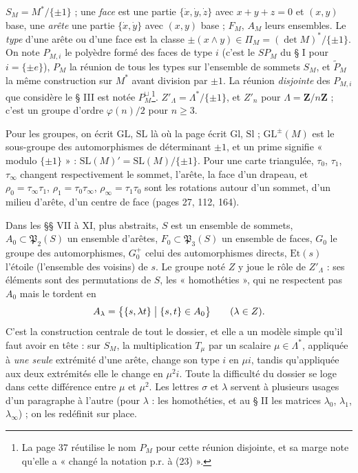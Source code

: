 \documentclass[11pt,a4paper]{article}
\begin{document}
$S_M = M^{*}/\{\pm 1\}$ ; une \emph{face} est une partie $\{\dot x, \dot y,
\dot z\}$ avec $x + y + z = 0$ et $(x, y)$ base, une \emph{arête} une partie
$\{\dot x, \dot y\}$ avec $(x, y)$ base ; $F_M$, $A_M$ leurs ensembles.
Le \emph{type} d'une arête ou d'une face est la classe $\pm(x \wedge y) \in
\Pi_M = (\det M)^{*}/\{\pm 1\}$. On note $P_{M,i}$ le polyèdre formé des faces
de type $i$ (c'est le $SP_M$ du § I pour $i = \{\pm e\}$), $P_M$ la réunion de
tous les types sur l'ensemble de sommets $S_M$, et $\widetilde{P}_M$ la même
construction sur $M^{*}$ avant division par $\pm 1$. La réunion
\emph{disjointe} des $P_{M,i}$ que considère le § III est notée
$P_M^{\sqcup}$\footnote{La page 37 réutilise le nom $P_M$ pour cette réunion
disjointe, et sa marge note qu'elle a « changé la notation p.r. à (23) ».}.
$Z'_\Lambda = \Lambda^{*}/\{\pm 1\}$, et $Z'_n$ pour $\Lambda =
\mathbf{Z}/n\mathbf{Z}$ ; c'est un groupe d'ordre $\varphi(n)/2$ pour $n \geq
3$.

Pour les groupes, on écrit $\mathrm{GL}$, $\mathrm{SL}$ là où la page écrit
$\mathrm{Gl}$, $\mathrm{Sl}$ ; $\mathrm{GL}^{\pm}(M)$ est le sous-groupe des
automorphismes de déterminant $\pm 1$, et un prime signifie « modulo $\{\pm
1\}$ » : $\mathrm{SL}(M)' = \mathrm{SL}(M)/\{\pm 1\}$. Pour une carte
triangulée, $\tau_0$, $\tau_1$, $\tau_\infty$ changent respectivement le
sommet, l'arête, la face d'un drapeau, et $\rho_0 = \tau_\infty\tau_1$,
$\rho_1 = \tau_0\tau_\infty$, $\rho_\infty = \tau_1\tau_0$ sont les rotations
autour d'un sommet, d'un milieu d'arête, d'un centre de face (pages 27, 112,
164).

Dans les §§ VII à XI, plus abstraits, $S$ est un ensemble de sommets, $A_0
\subset \mathfrak{P}_2(S)$ un ensemble d'arêtes, $F_0 \subset
\mathfrak{P}_3(S)$ un ensemble de faces, $G_0$ le groupe des automorphismes,
$G_0^{+}$ celui des automorphismes directs, $\mathrm{Et}(s)$ l'étoile
(l'ensemble des voisins) de $s$. Le groupe noté $Z$ y joue le rôle de
$Z'_\Lambda$ : ses éléments sont des permutations de $S$, les
« homothéties », qui ne respectent pas $A_0$ mais le tordent en
\[
  A_\lambda = \bigl\{ \{s, \lambda t\} \bigm| \{s, t\} \in A_0 \bigr\}
  \qquad (\lambda \in Z) .
\]
C'est la construction centrale de tout le dossier, et elle a un modèle simple
qu'il faut avoir en tête : sur $S_M$, la multiplication $T_\mu$ par un scalaire
$\mu \in \Lambda^{*}$, appliquée à \emph{une seule} extrémité d'une arête,
change son type $i$ en $\mu i$, tandis qu'appliquée aux deux extrémités elle le
change en $\mu^2 i$. Toute la difficulté du dossier se loge dans cette
différence entre $\mu$ et $\mu^2$. Les lettres $\sigma$ et $\lambda$ servent à
plusieurs usages d'un paragraphe à l'autre (pour $\lambda$ : les homothéties,
et au § II les matrices $\lambda_0$, $\lambda_1$, $\lambda_\infty$) ; on les
redéfinit sur place.
\end{document}
